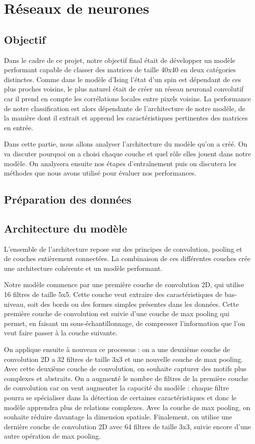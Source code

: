 \documentclass[11pt, parskip=half]{scrartcl} %
\begin{document}
\section{Réseaux de neurones}
\subsection{Objectif}
Dans le cadre de ce projet, notre objectif final était de développer un modèle performant capable de classer des matrices de taille 40x40 en deux catégories distinctes. Comme dans le modèle d’Ising l’état d’un spin est dépendant de ces plus proches voisins, le plus naturel était de créer un réseau neuronal convolutif car il prend en compte les corrélations locales entre pixels voisins. La performance de notre classification est alors dépendante de l’architecture de notre modèle, de la manière dont il extrait et apprend les caractéristiques pertinentes des matrices en entrée.

Dans cette partie, nous allons analyser l’architecture du modèle qu’on a créé. On va discuter pourquoi on a choisi chaque couche et quel rôle elles jouent dans notre modèle. On analysera ensuite nos étapes d’entraînement puis on discutera les méthodes que nous avons utilisé pour évaluer nos performances.

\subsection{Préparation des données}

\subsection{Architecture du modèle}
L’ensemble de l’architecture repose sur des principes de convolution, pooling et de couches entièrement connectées. La combinaison de ces différentes couches crée une architecture cohérente et un modèle performant.

Notre modèle commence par une première couche de convolution 2D, qui utilise 16 filtres de taille 5x5. Cette couche veut extraire des caractéristiques de bas-niveau, soit des bords ou des formes simples présentes dans les données. Cette première couche de convolution est suivie d’une couche de max pooling qui permet, en faisant un sous-échantillonnage, de compresser l’information que l’on veut faire passer à la couche suivante.

On applique ensuite à nouveau ce processus : on a une deuxième couche de convolution 2D a 32 filtres de taille 3x3 et une nouvelle couche de max pooling. Avec cette deuxième couche de convolution, on souhaite capturer des motifs plus complexes et abstraits. On a augmenté le nombre de filtres de la première couche de convolution car on veut augmenter la capacité du modèle : chaque filtre pourra se spécialiser dans la détection de certaines caractéristiques et donc le modèle apprendra plus de relations complexes. Avec la couche de max pooling, on souhaite réduire davantage la dimension spatiale. Finalement, on utilise une dernière couche de convolution 2D avec 64 filtres de taille 3x3, suivie encore d’une autre opération de max pooling.
\end{document}
